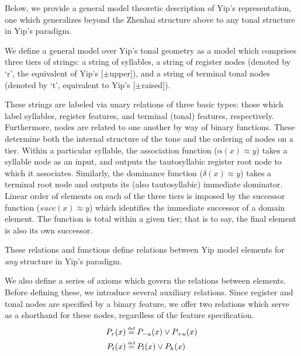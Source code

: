\documentclass{article}
\newcommand\myeq{\mathrel{\stackrel{\makebox[0pt]{\mbox{\normalfont\tiny def}}}{=}}}
\newcommand{\ap}{\approx}
\begin{document}
Below, we provide a general model theoretic description of Yip's representation, one which generalizes beyond the Zhenhai structure above to any tonal structure in Yip's paradigm. \par
We define a general model over Yip's tonal geometry as a model which comprises three tiers of strings: a string of syllables, a string of register nodes (denoted by `r', the equivalent of Yip's [$\pm$upper]), and a string of terminal tonal nodes (denoted by `t', equivalent to Yip's [$\pm$raised]).
\begin{center}
\end{center}
These strings are labeled via unary relations of three basic types: those which label syllables, register features, and terminal (tonal) features, respectively. Furthermore, nodes are related to one another by way of binary functions. These determine both the internal structure of the tone and the ordering of nodes on a tier. Within a particular syllable, the association function ($\alpha(x)\ap y$) takes a syllable node as an input, and outputs the tautosyllabic register root node to which it associates. Similarly, the dominance function ($\delta(x)\ap y$) takes a terminal root node and outputs its (also tautosyllabic) immediate dominator. Linear order of elements on each of the three tiers is imposed by the successor function ($succ(x)\ap y$) which identifies the immediate successor of a domain element. The function is total within a given tier; that is to say, the final element is also its own successor. \par
These relations and functions define relations between Yip model elements for \emph{any} structure in Yip's paradigm.  \par
We also define a series of axioms which govern the relations between elements. Before defining these, we introduce several auxiliary relations. Since register and tonal nodes are specified by a binary feature, we offer two relations which serve as a shorthand for these nodes, regardless of the feature specification.
\begin{equation} \label{aux1}
\begin{aligned}
P_{r}(x)&\myeq P_{-u}(x) \lor P_{+u}(x) \\
P_{t}(x)&\myeq P_{l}(x) \lor P_{h}(x)\\
\end{aligned}
\end{equation}
\end{document}
